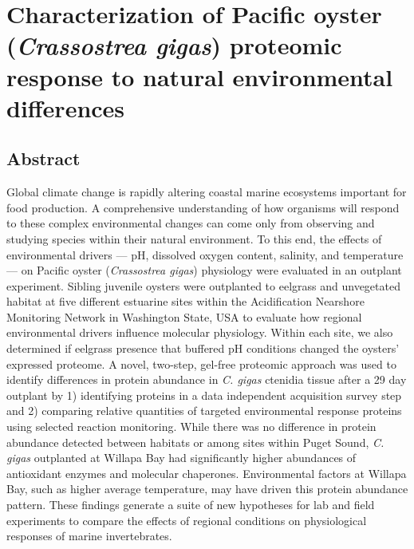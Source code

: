 \documentclass [11pt, proquest] {uwthesis}[2015/03/03]
\begin{document}
\hypertarget{characterization-of-pacific-oyster-crassostrea-gigas-proteomic-response-to-natural-environmental-differences}{%
\chapter{\texorpdfstring{Characterization of Pacific oyster (\emph{Crassostrea gigas}) proteomic response to natural environmental differences}{Characterization of Pacific oyster (Crassostrea gigas) proteomic response to natural environmental differences}}\label{characterization-of-pacific-oyster-crassostrea-gigas-proteomic-response-to-natural-environmental-differences}}

\hypertarget{abstract}{%
\section{Abstract}\label{abstract}}

Global climate change is rapidly altering coastal marine ecosystems important for food production. A comprehensive understanding of how organisms will respond to these complex environmental changes can come only from observing and studying species within their natural environment. To this end, the effects of environmental drivers --- pH, dissolved oxygen content, salinity, and temperature --- on Pacific oyster (\emph{Crassostrea gigas}) physiology were evaluated in an outplant experiment. Sibling juvenile oysters were outplanted to eelgrass and unvegetated habitat at five different estuarine sites within the Acidification Nearshore Monitoring Network in Washington State, USA to evaluate how regional environmental drivers influence molecular physiology. Within each site, we also determined if eelgrass presence that buffered pH conditions changed the oysters' expressed proteome. A novel, two-step, gel-free proteomic approach was used to identify differences in protein abundance in \emph{C. gigas} ctenidia tissue after a 29 day outplant by 1) identifying proteins in a data independent acquisition survey step and 2) comparing relative quantities of targeted environmental response proteins using selected reaction monitoring. While there was no difference in protein abundance detected between habitats or among sites within Puget Sound, \emph{C. gigas} outplanted at Willapa Bay had significantly higher abundances of antioxidant enzymes and molecular chaperones. Environmental factors at Willapa Bay, such as higher average temperature, may have driven this protein abundance pattern. These findings generate a suite of new hypotheses for lab and field experiments to compare the effects of regional conditions on physiological responses of marine invertebrates.
\end{document}
